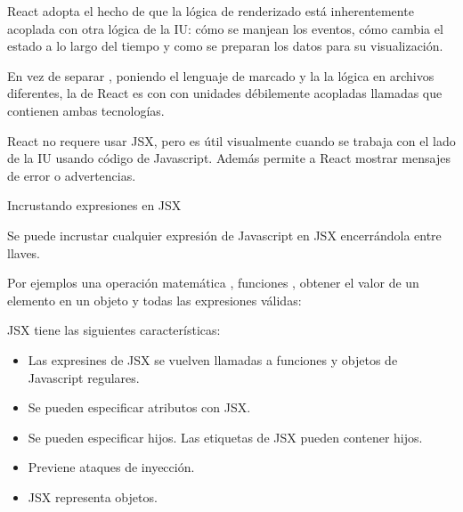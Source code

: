 React adopta el hecho de que la lógica de renderizado está inherentemente
acoplada con otra lógica de la IU: cómo se manjean los eventos, cómo cambia el
estado a lo largo del tiempo y como se preparan los datos para su visualización.

En vez de separar , poniendo el lenguaje de marcado
y la la lógica en archivos diferentes, la
de React es con con unidades débilemente acopladas llamadas 
que contienen ambas tecnologías.

React no requere usar JSX, pero es útil visualmente cuando se trabaja con el lado
de la IU usando código de Javascript. Además permite a React mostrar mensajes
de error o advertencias.

Incrustando expresiones en JSX

Se puede incrustar cualquier expresión de Javascript en JSX encerrándola entre
llaves.

Por ejemplos una operación matemática , funciones ,
obtener el valor de un elemento en un objeto  y todas las
expresiones válidas:

%
\begin{sphinxVerbatim}[commandchars=\\\{\}]
  
     
   
     
\end{sphinxVerbatim}

JSX tiene las siguientes características:
\begin{itemize}
\item {} 
Las expresines de JSX se vuelven llamadas a funciones y objetos de Javascript regulares.

\item {} 
Se pueden especificar atributos con JSX.

\item {} 
Se pueden especificar hijos. Las etiquetas de JSX pueden contener hijos.

\item {} 
Previene ataques de inyección.

\item {} 
JSX representa objetos.

\end{itemize}


